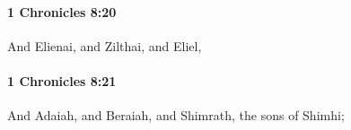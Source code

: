 		\paragraph{1 Chronicles 8:20} %
			\label{1CHRONICLES-8-20}

			And Elienai, and Zilthai, and Eliel,


		\paragraph{1 Chronicles 8:21} %
			\label{1CHRONICLES-8-21}

			And Adaiah, and Beraiah, and Shimrath, the sons of Shimhi;


